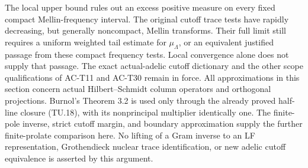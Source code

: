 \begin{remark}
The local upper bound rules out an excess positive measure
on every fixed compact Mellin-frequency interval.
The original cutoff trace tests have rapidly decreasing,
but generally noncompact, Mellin transforms.
Their full limit still requires a uniform weighted tail
estimate for \(\mu_\Lambda\), or an equivalent
justified passage from these compact frequency tests.
Local convergence alone does not supply that passage.
The exact actual-adelic cutoff dictionary and the other
scope qualifications of AC-T11 and AC-T30 remain in force.
All approximations in this section concern actual
Hilbert--Schmidt column operators and orthogonal projections.
Burnol's Theorem 3.2 is used only through the already proved
half-line closure (TU.18), with its nonprincipal multiplier
identically one.  The finite-pole inverse, strict cutoff
margin, and boundary approximation supply the further
finite-prolate comparison here.
No lifting of a Gram inverse to an LF representation,
Grothendieck nuclear trace identification, or new adelic
cutoff equivalence is asserted by this argument.
\end{remark}
